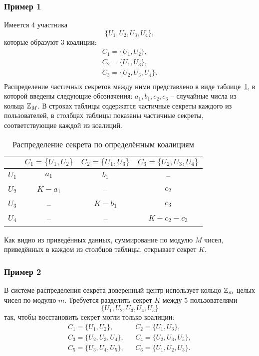 \subsubsection{Пример 1}

Имеется 4 участника
    \[ \{ U_1, U_2, U_3, U_4 \}, \]
которые образуют 3 коалиции:
\[ \begin{array}{l}
    C_1 = \{ U_1, U_2 \}, \\
    C_2 = \{ U_1, U_3 \}, \\
    C_3 = \{ U_2, U_3, U_4 \}. \\
\end{array} \]
Распределение частичных секретов между ними представлено в виде таблице~\ref{tab:secret-share-coalition-1}, в которой введены следующие обозначения: $a_1, b_1, c_2, c_3$ -- случайные числа из кольца $\mathbb{Z}_M$. В строках таблицы содержатся частичные секреты каждого из пользователей, в столбцах таблицы показаны частичные секреты, соответствующие каждой из коалиций.

\begin{table}[!ht]
    \centering
    \caption{Распределение секрета по определённым коалициям\label{tab:secret-share-coalition-1}}
    \begin{tabular}{|c||c|c|c|}
        \hline
              & $C_1 = \{ U_1, U_2 \}$ & $C_2 = \{U_1, U_3 \}$ & $C_3 = \{ U_2, U_3, U_4 \}$ \\
        \hline \hline
        $U_1$ & $a_1$     & $b_1$     & -- \\
        $U_2$ & $K - a_1$ & --        & $c_2$ \\
        $U_3$ & --        & $K - b_1$ & $c_3$  \\
        $U_4$ & --        & --        & $K - c_2 - c_3$ \\
        \hline
    \end{tabular}
\end{table}

Как видно из приведённых данных, суммирование по модулю $M$ чисел, приведённых в каждом из столбцов таблицы, открывает секрет $K$.


\subsubsection{Пример 2}

В системе распределения секрета доверенный
центр использует кольцо $\mathbb{Z}_m$ целых чисел по модулю $m$. Требуется разделить секрет $K$ между $5$ пользователями
    \[ \{ U_1, U_2, U_3, U_4, U_5 \} \]
так, чтобы восстановить секрет могли только коалиции:
\[ \begin{array}{lll}
    C_1 = \{ U_1, U_2 \},      & & C_2 = \{ U_1, U_3 \}, \\
    C_3 = \{ U_2, U_3, U_4 \}, & & C_4 = \{ U_2, U_3, U_5 \}, \\
    C_5 = \{ U_3, U_4, U_5 \}, & & C_6 = \{ U_1, U_2, U_3 \}. \\
\end{array} \]

